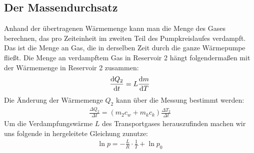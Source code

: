 \subsection{Der Massendurchsatz \cite[vgl.][]{man:v206}}
Anhand der übertragenen Wärmemenge kann man die Menge des Gases berechnen, das pro Zeiteinheit
im zweiten Teil des Pumpkreislaufes verdampft.
Das ist die Menge an Gas, die in derselben Zeit durch die ganze Wärmepumpe fließt.
Die Menge an verdampftem Gas in Reservoir 2 hängt folgendermaßen mit der Wärmemenge in Reservoir 2 zusammen:
\begin{align}
    \frac{\mathop{}\!\mathrm{d} Q_2}{\mathop{}\!\mathrm{d} t} = L \frac{\mathop{}\!\mathrm{d} m}{\mathop{}\!\mathrm{d} T}
\end{align} 
Die Änderung der Wärmemenge $ Q_2$ kann über die Messung bestimmt werden:
\begin{align}
    \frac{\Delta Q_2}{\Delta t} = (m_2 c_w + m_k c_k) \frac{\Delta T_2}{\Delta t}
\end{align} 
Um die Verdampfungswärme $L$ des Transportgases herauszufinden machen wir uns folgende in \cite[][5]{man:v203} hergeleitete
Gleichung zunutze:
\begin{align}
    \ln{p} = -\frac{L}{R}\cdot \frac{1}{T} + \ln{p_0}
    \label{eq:Dampfdruckkurve}
\end{align}
